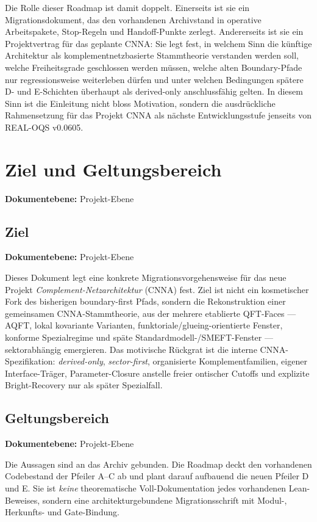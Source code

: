 \documentclass[11pt,a4paper]{article}
\let\oldpath\path
\renewcommand{\path}[1]{\oldpath{#1}}
\newcommand{\doclevel}[1]{\par\small\noindent\textbf{Dokumentebene:} #1\par\normalsize\medskip}
\begin{document}
Die Rolle dieser Roadmap ist damit doppelt. Einerseits ist sie ein Migrationsdokument, das den vorhandenen
Archivstand in operative Arbeitspakete, Stop-Regeln und Handoff-Punkte zerlegt. Andererseits ist sie ein
Projektvertrag für das geplante CNNA: Sie legt fest, in welchem Sinn die künftige Architektur als
komplementnetzbasierte Stammtheorie verstanden werden soll, welche Freiheitsgrade geschlossen werden
müssen, welche alten Boundary-Pfade nur regressionsweise weiterleben dürfen und unter welchen Bedingungen
spätere D- und E-Schichten überhaupt als derived-only anschlussfähig gelten. In diesem Sinn ist die
Einleitung nicht bloss Motivation, sondern die ausdrückliche Rahmensetzung für das Projekt CNNA als
nächste Entwicklungsstufe jenseits von REAL-OQS v0.0605.
\newpage
\section{Ziel und Geltungsbereich}
\doclevel{Projekt-Ebene}

\subsection{Ziel}
\doclevel{Projekt-Ebene}
Dieses Dokument legt eine konkrete Migrationsvorgehensweise für das neue Projekt
\emph{Complement-Netzarchitektur} (CNNA) fest. Ziel ist nicht ein kosmetischer Fork des bisherigen
boundary-first Pfads, sondern die Rekonstruktion einer gemeinsamen CNNA-Stammtheorie, aus der
mehrere etablierte QFT-Faces --- AQFT, lokal kovariante Varianten, funktoriale/glueing-orientierte
Fenster, konforme Spezialregime und späte Standardmodell-/SMEFT-Fenster --- sektorabhängig
emergieren. Das motivische Rückgrat ist die interne CNNA-Spezifikation: \emph{derived-only},
\emph{sector-first}, organisierte Komplementfamilien, eigener Interface-Träger, Parameter-Closure
anstelle freier ontischer Cutoffs und explizite Bright-Recovery nur als später Spezialfall.\cite[pp.~1--10, 20--36]{CNNASpec}

\subsection{Geltungsbereich}
\doclevel{Projekt-Ebene}
Die Aussagen sind an das Archiv
 gebunden.\cite[p.~7]{RulebookV18}
Die Roadmap deckt den vorhandenen Codebestand der Pfeiler A--C ab und plant darauf aufbauend die
neuen Pfeiler D und E. Sie ist \emph{keine} theorematische Voll-Dokumentation jedes vorhandenen
Lean-Beweises, sondern eine architekturgebundene Migrationsschrift mit Modul-, Herkunfts- und
Gate-Bindung.
\end{document}
